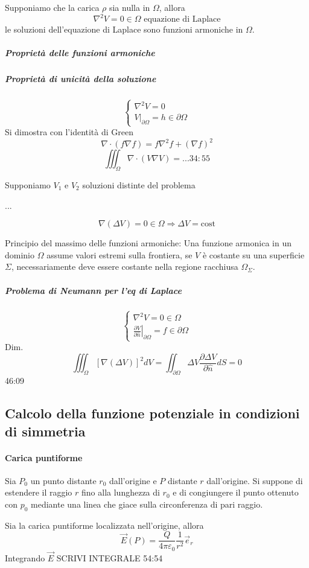 Supponiamo che la carica $\rho$ sia nulla in $\Omega$, allora
$$
\nabla^2 V = 0 \in \Omega \text{ equazione di Laplace}
$$
le soluzioni dell'equazione di Laplace sono funzioni armoniche in $\Omega$.

\subparagraph{Proprietà delle funzioni armoniche}

\subparagraph{Proprietà di unicità della soluzione}
$$
\begin{cases}
\nabla^2 V = 0\\
\left.V\right|_{\partial\Omega} = h \in \partial\Omega
\end{cases}
$$
Si dimostra con l'identità di Green
$$
\nabla\cdot(f\nabla f) = f\nabla^2f + (\nabla f)^2
$$
$$
\iiint_\Omega \nabla\cdot(V\nabla V) = ... 34:55
$$

Supponiamo $V_1$ e $V_2$ soluzioni distinte del problema

...

$$
\nabla(\Delta V) = 0 \in \Omega \Rightarrow \Delta V = \text{cost}
$$

Principio del massimo delle funzioni armoniche:
Una funzione armonica in un dominio $\Omega$ assume valori estremi sulla frontiera, se $V$ è costante
su una superficie $\Sigma$, necessariamente deve essere costante nella regione racchiusa $\Omega_\Sigma$.


\subparagraph{Problema di Neumann per l'eq di Laplace}
$$
\begin{cases}
\nabla^2 V = 0 \in \Omega\\
\left.\frac{\partial V}{\partial\hat{n}}\right|_{\partial \Omega} = f \in \partial \Omega
\end{cases}
$$
Dim.
$$
\iiint_{\Omega} \left[\nabla(\Delta V)\right]^2 dV = \iint_{\partial\Omega} \Delta V \frac{\partial\Delta V}{\partial \hat{n}} dS = 0
$$
46:09

\subsection{Calcolo della funzione potenziale in condizioni di simmetria}
\paragraph{Carica puntiforme}
Sia $P_0$ un punto distante $r_0$ dall'origine e $P$ distante $r$ dall'origine.
Si suppone di estendere il raggio $r$ fino alla lunghezza di $r_0$ e di congiungere il punto
ottenuto con $p_0$ mediante una linea che giace sulla circonferenza di pari raggio.

Sia la carica puntiforme localizzata nell'origine, allora
$$
\vec{E}(P) = \frac{Q}{4\pi \varepsilon_0}\frac{1}{r^2} \vec{e}_r
$$
Integrando $\vec{E}$
SCRIVI INTEGRALE 54:54

